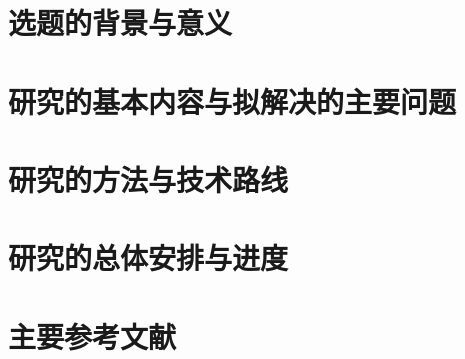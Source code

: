 \section{选题的背景与意义}

\section{研究的基本内容与拟解决的主要问题}

\section{研究的方法与技术路线}

\section{研究的总体安排与进度}

\section{主要参考文献}